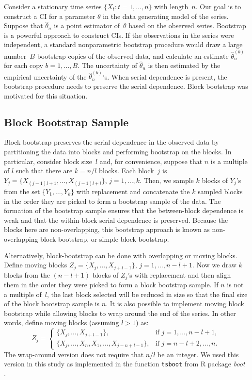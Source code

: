 \documentclass[12pt, letterpaper, titlepage]{article}
\begin{document}
Consider a stationary time series $\{X_t: t = 1, \ldots, n\}$ with length~$n$.
Our goal is to construct a CI for a parameter $\theta$ in the
data generating model of the series. Suppose that $\hat\theta_n$ is a point
estimator of~$\theta$ based on the observed series. Bootstrap is a powerful
approach to construct CIs. If the observations in the series
were independent, a standard nonparametric bootstrap procedure would draw a
large number~$B$ bootstrap copies of the observed data, and calculate an
estimate $\hat\theta_n^{(b)}$ for each copy $b = 1, \ldots, B$. The uncertainty
of $\hat\theta_n$ is then estimated by the empirical uncertainty of the
$\hat\theta_n^{(b)}$'s. When serial dependence is present, the bootstrap
procedure needs to preserve the serial dependence. Block bootstrap was
motivated for this situation. 


\subsection{Block Bootstrap Sample}

Block bootstrap preserves the serial dependence in the observed data by
partitioning the data into blocks and performing bootstrap on the blocks.
In particular, consider block size~$l$ and, for convenience, suppose that
$n$ is a multiple of $l$ such that there are $k = n / l$ blocks. Each block~$j$
is $Y_j = \{X_{(j - 1) l + 1}, \ldots, X_{(j - 1) l + l}\}$,
$j = 1, \ldots,   k$.  Then, we sample $k$ blocks of $Y_j$'s from the set 
$\{Y_1, \ldots, Y_k\}$ with replacement and concatenate the $k$ sampled blocks
in the order they are picked to form a bootstrap sample of the data. The
formation of the bootstrap sample ensures that the between-block dependence is
weak and that the within-block serial dependence is preserved. Because the
blocks here are non-overlapping, this bootstrap approach is known as
non-overlapping block bootstrap, or simple block bootstrap.


Alternatively, block-bootstrap can be done with overlapping or moving blocks.
Define moving blocks $Z_j = \{X_j, \ldots, X_{j + l - 1}\}$,
$j = 1, \ldots, n - l + 1$. Now we draw $k$ blocks from the $(n - l + 1)$
blocks
of $Z_j$'s with replacement and then align them in the order they were
picked
to form a block bootstrap sample. If $n$ is not a multiple of~$l$, the last
block selected will be reduced in size so that the final size of the
block bootstrap sample is $n$. It is also possible to implement moving block
bootstrap while allowing blocks to wrap around the end of the series. In other
words, define moving blocks (assuming $l > 1$) as:
\begin{equation}
Z_j =
    \begin{cases}
        \{X_j, \ldots, X_{j + l - 1}\}, & \text{if } j = 1, \dots, n - l + 1,\\
        \{X_j, \ldots, X_n, X_1, \ldots, X_{j-n+l-1}\}, & \text{if } j = n - l
        + 2 ,\dots, n.
    \end{cases}
\end{equation}
The wrap-around version does not require that $n/l$ be an integer.
We used this version in this study as implemented in the function
\texttt{tsboot} from R package \textsl{boot} \citep{boot}.
\end{document}
